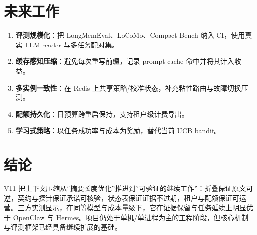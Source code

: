 \documentclass[11pt,a4paper]{ctexart}
\begin{document}
\section{未来工作}
\begin{enumerate}
  \item \textbf{评测规模化}：把 LongMemEval、LoCoMo、Compact-Bench 纳入 CI，使用真实 LLM reader 与多任务配对集。
  \item \textbf{缓存感知压缩}：避免每次重写前缀，记录 prompt cache 命中并将其计入收益。
  \item \textbf{多实例一致性}：在 Redis 上共享策略/校准状态，补充粘性路由与故障切换压测。
  \item \textbf{配额持久化}：日预算跨重启保持，支持租户级计费导出。
  \item \textbf{学习式策略}：以任务成功率与成本为奖励，替代当前 UCB bandit。
\end{enumerate}

\section{结论}
V11 把上下文压缩从“摘要长度优化”推进到“可验证的继续工作”：折叠保证原文可逆，契约与探针保证承诺可核验，状态表保证证据不过期，租户与配额保证可运营。三方实测显示，在同等模型与成本量级下，它在证据保留与任务延续上明显优于 OpenClaw 与 Hermes。项目仍处于单机/单进程为主的工程阶段，但核心机制与评测框架已经具备继续扩展的基础。

\appendix
\end{document}
